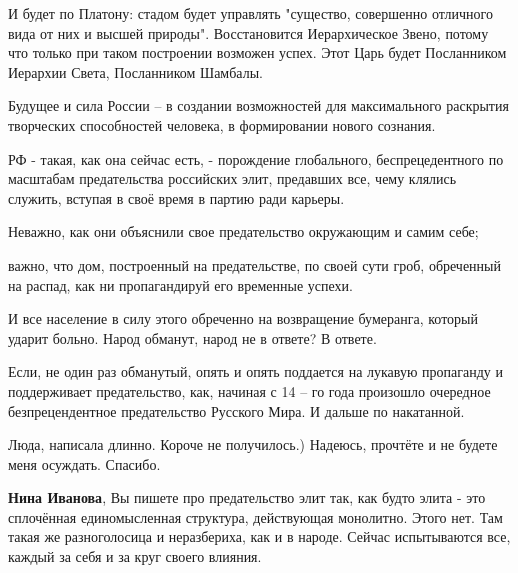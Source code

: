 \begin{itemize}
\begin{itemize}
И будет по Платону: стадом будет управлять "существо, совершенно отличного вида
от них и высшей природы". Восстановится Иерархическое Звено, потому что только
при таком построении возможен успех. Этот Царь будет Посланником Иерархии
Света, Посланником Шамбалы.

Будущее и сила России – в создании возможностей для максимального раскрытия
творческих способностей человека, в формировании нового сознания.

РФ - такая, как она сейчас есть, - порождение глобального, беспрецедентного по
масштабам предательства российских элит, предавших все, чему клялись служить,
вступая в своё время в партию ради карьеры.

Неважно, как они объяснили свое предательство окружающим и самим себе;

важно, что дом, построенный на предательстве, по своей сути гроб, обреченный на распад, как ни пропагандируй его временные успехи.

И все население в силу этого обреченно на возвращение бумеранга, который ударит больно. Народ обманут, народ не в ответе? В ответе.

Если, не один раз обманутый, опять и опять поддается на лукавую пропаганду и
поддерживает предательство, как, начиная с 14 – го года произошло очередное
безпрецендентное предательство Русского Мира. И дальше по накатанной.


 
Люда, написала длинно. Короче не получилось.) Надеюсь, прочтёте и не будете меня осуждать. Спасибо.🌹

 
\textbf{Нина Иванова}, Вы пишете про предательство элит так, как будто элита - это сплочённая единомысленная структура, действующая монолитно. Этого нет. Там такая же разноголосица и неразбериха, как и в народе. Сейчас испытываются все, каждый за себя и за круг своего влияния.

 

\end{itemize}
\end{itemize}
